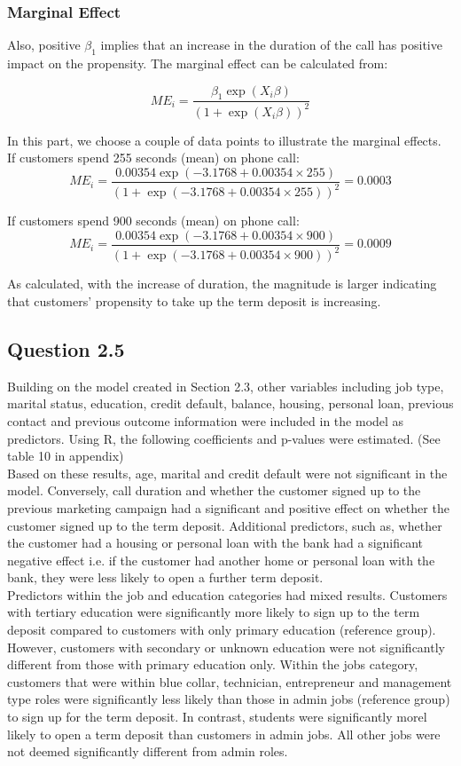 \documentclass[11pt]{article}
\begin{document}
{\subsubsection*{Marginal Effect}
Also, positive $\beta_1$ implies that an increase in the duration of the call has positive impact on the propensity. The marginal effect can be calculated from:

$$ME_i = \frac{\beta_1 \exp(X_i \beta)}{(1+\exp(X_i \beta))^2}$$

In this part, we choose a couple of data points to illustrate the marginal effects.\\

If customers spend 255 seconds (mean) on phone call:
$$ME_i = \frac{0.00354 \exp(-3.1768 + 0.00354 \times 255)}{(1+\exp(-3.1768 + 0.00354 \times 255))^2} = 0.0003$$

If customers spend 900 seconds (mean) on phone call:
$$ME_i = \frac{0.00354 \exp(-3.1768 + 0.00354 \times 900)}{(1+\exp(-3.1768 + 0.00354 \times 900))^2} = 0.0009$$

As calculated, with the increase of duration, the magnitude is larger indicating that customers’ propensity to take up the term deposit is increasing. 

\subsection*{Question 2.5}
Building on the model created in Section 2.3, other variables including job type, marital status, education, credit default, balance, housing, personal loan, previous contact and previous outcome information were included in the model as predictors. Using R, the following coefficients and p-values were estimated. (See table 10 in appendix)\\

Based on these results, age, marital and credit default were not significant in the model. Conversely, call duration and whether the customer signed up to the previous marketing campaign had a significant and positive effect on whether the customer signed up to the term deposit. Additional predictors, such as, whether the customer had a housing or personal loan with the bank had a significant negative effect i.e. if the customer had another home or personal loan with the bank, they were less likely to open a further term deposit.\\

Predictors within the job and education categories had mixed results. Customers with tertiary education were significantly more likely to sign up to the term deposit compared to customers with only primary education (reference group). However, customers with secondary or unknown education were not significantly different from those with primary education only. Within the jobs category, customers that were within blue collar, technician, entrepreneur and management type roles were significantly less likely than those in admin jobs (reference group) to sign up for the term deposit. In contrast, students were significantly morel likely to open a term deposit than customers in admin jobs. All other jobs were not deemed significantly different from admin roles.\\

}
\end{document}
